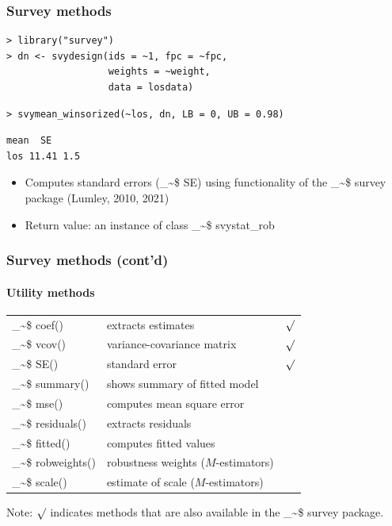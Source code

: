 \documentclass[framenumber,t]{beamer}
\makeatletter
\newcommand\code{\bgroup\@makeother\_\@makeother\~\@makeother\$\@makeother\^\@codex}
\def\@codex#1{{\normalfont\ttfamily\hyphenchar\font=-1 #1}\egroup}
\makeatother
\begin{document}
\begin{frame}[fragile]
\frametitle{Survey methods}
\begin{lstlisting}[style=in_big]
> library("survey")
> dn <- svydesign(ids = ~1, fpc = ~fpc,
                  weights = ~weight,
                  data = losdata)
\end{lstlisting}
\vspace{1em}
\begin{lstlisting}[style=in_big]
> svymean_winsorized(~los, dn, LB = 0, UB = 0.98)
\end{lstlisting}
\vspace{-0.5em}
\begin{lstlisting}[style=out_big]
     mean  SE
los 11.41 1.5
\end{lstlisting}
\vspace{0.5em}
\begin{itemize}
    \setlength\itemsep{0.5em}
    \item Computes \alert{standard errors (\code{SE})}
        using functionality of the \code{survey} package (Lumley, 2010, 2021)
    \item Return value: an instance of class \code{svystat_rob}
\end{itemize}
\end{frame}

\begin{frame}
\frametitle{Survey methods {\small (cont'd)}\vspace{0.25em}}
\framesubtitle{Utility methods}

\begin{tabular}{llr}
    \code{coef()}& extracts estimates&$\surd$\\
    \code{vcov()}& variance-covariance matrix&$\surd$\\
    \code{SE()}& standard error&$\surd$\\
    \alert{\code{summary()}}& shows summary of fitted model&\\
    \alert{\code{mse()}}& computes mean square error&\\
    \alert{\code{residuals()}}& extracts residuals&\\
    \alert{\code{fitted()}}& computes fitted values&\\
    \alert{\code{robweights()}}& robustness weights ($M$-estimators)&\\
    \alert{\code{scale()}}& estimate of scale ($M$-estimators)&\\
\end{tabular}
\vspace{1em}

{\small Note: $\surd$ indicates methods that are also available in the
    \code{survey} package.}
\end{frame}
\end{document}
